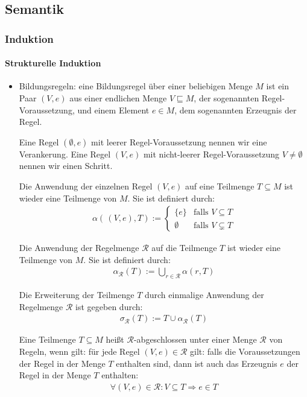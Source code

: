 \documentclass[
  a4paper,
  11pt,
]{scrartcl}
\newcommand{\Rc}{\mathcal{R}}
\begin{document}
\subsection{Semantik}
\label{sub:themen_inhalte_semantik}

\subsubsection{Induktion}
\label{ssub:Induktion}

\paragraph{Strukturelle Induktion}
\label{par:strukturelle_induktion}

\begin{itemize}
  \item Bildungsregeln: eine Bildungsregel über einer beliebigen Menge $M$ ist
    ein Paar $(V, e)$ aus einer endlichen Menge $V \sqsubseteq M$, der
    sogenannten Regel-Voraussetzung, und einem Element $e \in M$, dem
    sogenannten Erzeugnis der Regel.

    Eine Regel $(\emptyset, e)$ mit leerer Regel-Voraussetzung nennen wir eine
    Verankerung. Eine Regel $(V, e)$ mit nicht-leerer Regel-Voraussetzung $V
    \neq \emptyset$ nennen wir einen Schritt.

    Die Anwendung der einzelnen Regel $(V, e)$ auf eine Teilmenge $T \subseteq
    M$ ist wieder eine Teilmenge von $M$. Sie ist definiert durch:
    \begin{align*}
      \alpha( \, (V, e), T) :=
      \begin{cases}
        \{ e \} & \text{falls } V \subseteq T\\
        \emptyset & \text{falls } V \subsetneq T
      \end{cases}
    \end{align*}

    Die Anwendung der Regelmenge $\Rc$ auf die Teilmenge $T$ ist wieder eine
    Teilmenge von $M$. Sie ist definiert durch:
    \begin{align*}
      \alpha_{\Rc}(T) := \bigcup\limits_{r \in \Rc} \alpha(r, T)
    \end{align*}

    Die Erweiterung der Teilmenge $T$ durch einmalige Anwendung der Regelmenge
    $\Rc$ ist gegeben durch:
    \begin{align*}
      \sigma_{\Rc}(T) := T \cup \alpha_{\Rc}(T)
    \end{align*}

    Eine Teilmenge $T \subseteq M$ heißt $\Rc$-abgeschlossen unter einer Menge
    $\Rc$ von Regeln, wenn gilt: für jede Regel $(V, e) \in \Rc$ gilt: falls die
    Voraussetzungen der Regel in der Menge $T$ enthalten sind, dann ist auch das
    Erzeugnis $e$ der Regel in der Menge $T$ enthalten:
    \begin{align*}
      \forall (V, e) \in \Rc: V \subseteq T \Rightarrow e \in T
    \end{align*}
\end{itemize}
\end{document}
